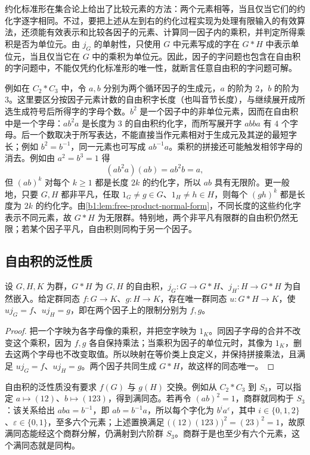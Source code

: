 \ProseParagraphBreak
约化标准形在集合论上给出了比较元素的方法：两个元素相等，当且仅当它们的约化字逐字相同。不过，要把上述从左到右的约化过程实现为处理有限输入的有效算法，还须能有效表示和比较各因子的元素、计算同一因子内的乘积，并判定所得乘积是否为单位元。由 \(j_G\) 的单射性，只使用 \(G\) 中元素写成的字在 \(G*H\) 中表示单位元，当且仅当它在 \(G\) 中的乘积为单位元。因此，因子的字问题也包含在自由积的字问题中，不能仅凭约化标准形的唯一性，就断言任意自由积的字问题可解。

\ProseParagraphBreak
例如在 \(C_2*C_3\) 中，令 \(a,b\) 分别为两个循环因子的生成元，\(a\) 的阶为 \(2\)，\(b\) 的阶为 \(3\)。这里要区分按因子元素计数的自由积字长度（也叫音节长度），与继续展开成所选生成符号后所得字的字母个数。\(b^2\) 是一个因子中的非单位元素，因而在自由积中是一个字母：\(ab^2a\) 是长度为 \(3\) 的自由积约化字，而所写展开字 \(abba\) 有 \(4\) 个字母。后一个数取决于所写表达，不能直接当作元素相对于生成元及其逆的最短字长；例如 \(b^2=b^{-1}\)，同一元素也可写成 \(ab^{-1}a\)。乘积的拼接还可能触发相邻字母的消去。例如由 \(a^2=b^3=1\) 得
\[
	(ab^2a)(ab)=ab^2b=a,
\]
但 \((ab)^k\) 对每个 \(k\ge1\) 都是长度 \(2k\) 的约化字，所以 \(ab\) 具有无限阶。更一般地，只要 \(G,H\) 都非平凡，任取 \(1_G\neq g\in G\)、\(1_H\neq h\in H\)，则每个 \((gh)^k\) 都是长度为 \(2k\) 的约化字。由\cref{b1:lem:free-product-normal-form}，不同长度的这些约化字表示不同元素，故 \(G*H\) 为无限群。特别地，两个非平凡有限群的自由积仍然无限；若某个因子平凡，自由积则同构于另一个因子。

\subsection{自由积的泛性质}
\label{b1:subsec:0803:02}

\begin{theorem}[自由积的泛性质]\label{b1:thm:free-product-universal}
	设 \(G,H,K\) 为群，\(G*H\) 为 \(G,H\) 的自由积，\(j_G:G\to G*H\)、\(j_H:H\to G*H\) 为自然嵌入。给定群同态 \(f:G\to K\)、\(g:H\to K\)，存在唯一群同态 \(u:G*H\to K\)，使 \(uj_G=f\)、\(uj_H=g\)，即在两个因子上的限制分别为 \(f,g\)。
\end{theorem}
\begin{proof}
	把一个字映为各字母像的乘积，并把空字映为 \(1_K\)。同因子字母的合并不改变这个乘积，因为 \(f,g\) 各自保持乘法；当乘积为因子的单位元时，其像为 \(1_K\)，删去这两个字母也不改变取值。所以映射在等价类上良定义，并保持拼接乘法，且满足 \(uj_G=f\)、\(uj_H=g\)。两个因子共同生成 \(G*H\)，故这样的同态唯一。
\end{proof}

自由积的泛性质没有要求 \(f(G)\) 与 \(g(H)\) 交换。例如从 \(C_2*C_3\) 到 \(S_3\)，可以指定 \(a\mapsto(12)\)、\(b\mapsto(123)\)，得到满同态。若再令 \((ab)^2=1\)，商群就同构于 \(S_3\)：该关系给出 \(aba=b^{-1}\)，即 \(ab=b^{-1}a\)，所以每个字化为 \(b^i a^\varepsilon\)，其中 \(i\in\{0,1,2\}\)、\(\varepsilon\in\{0,1\}\)，至多六个元素；上述置换满足 \(\bigl((12)(123)\bigr)^2=(23)^2=1\)，故原满同态能经这个商群分解，仍满射到六阶群 \(S_3\)。商群于是也至少有六个元素，这个满同态就是同构。

